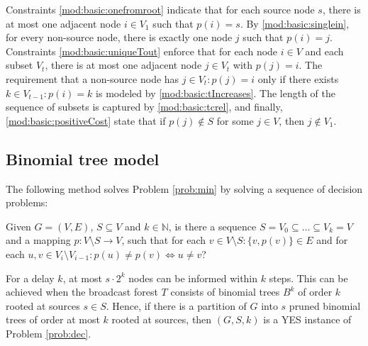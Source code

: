 Constraints \eqref{mod:basic:onefromroot} indicate that for each source node $s$, there is at most one adjacent node $i\in V_1$ such that $p(i)=s$.
By \eqref{mod:basic:singlein}, for every non-source node, there is exactly one node $j$ such that $p(i)=j$.
Constraints \eqref{mod:basic:uniqueTout} enforce that for each node $i\in V$ and each subset $V_t$, there is at most one adjacent node $j\in V_t$ with $p(j)=i$.
The requirement that a non-source node has $j\in V_t:p(j)=i$ only if there exists $k\in V_{t-1}: p(i)=k$ is modeled by \eqref{mod:basic:tIncreases}. 
The length of the sequence of subsets is captured by \eqref{mod:basic:tcrel}, and finally, \eqref{mod:basic:positiveCost} state that if $p(j)\not\in S$ for some $j\in V$, then $j\not\in V_1$.
\subsection{Binomial tree model}

The following method solves Problem \ref{prob:min} by solving a sequence of decision problems:
\begin{problem}
\label{prob:dec}
Given $G=(V,E)$, $S\subseteq V$ and $k\in \mathbb{N}$, is there a sequence $S=V_0\subseteq\dots\subseteq V_k=V$ 
and a mapping $p:V\setminus S\to V$, such that for each $v\in V\setminus S:\{v,p(v)\}\in E$ and for each  $u,v\in V_i\setminus V_{i-1}: p(u)\neq p(v)\Leftrightarrow u\neq v$?
\end{problem}
For a delay $k$, at most $s\cdot 2^k$ nodes can be informed within $k$ steps. 
This can be achieved when the broadcast forest $T$ consists of binomial trees $B^k$ of order $k$ rooted at sources $s\in S$.
Hence, if there is a partition of $G$ into $s$ pruned binomial trees of order at most $k$ rooted at sources, then $(G,S,k)$ is a YES instance of Problem \ref{prob:dec}.


